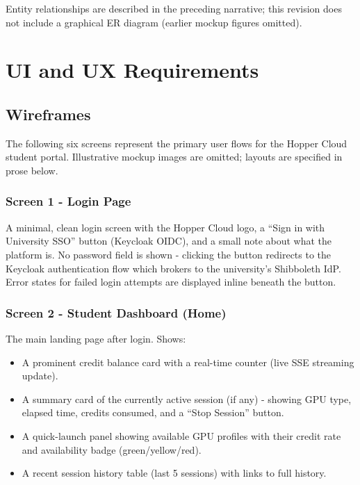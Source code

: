 \documentclass[12pt,a4paper]{article}
\begin{document}
Entity relationships are described in the preceding narrative; this revision does not include a graphical ER diagram (earlier mockup figures omitted).

\newpage
\section{UI and UX Requirements}

\subsection{Wireframes}

The following six screens represent the primary user flows for the Hopper Cloud student portal. Illustrative mockup images are omitted; layouts are specified in prose below.

\subsubsection*{Screen 1 - Login Page}
A minimal, clean login screen with the Hopper Cloud logo, a ``Sign in with University SSO'' button (Keycloak OIDC), and a small note about what the platform is. No password field is shown - clicking the button redirects to the Keycloak authentication flow which brokers to the university's Shibboleth IdP. Error states for failed login attempts are displayed inline beneath the button.

\subsubsection*{Screen 2 - Student Dashboard (Home)}
The main landing page after login. Shows:
\begin{itemize}[leftmargin=1.5em, topsep=2pt, itemsep=2pt]
  \item A prominent credit balance card with a real-time counter (live SSE streaming update).
  \item A summary card of the currently active session (if any) - showing GPU type, elapsed time, credits consumed, and a ``Stop Session'' button.
  \item A quick-launch panel showing available GPU profiles with their credit rate and availability badge (green/yellow/red).
  \item A recent session history table (last 5 sessions) with links to full history.
\end{itemize}
\end{document}
